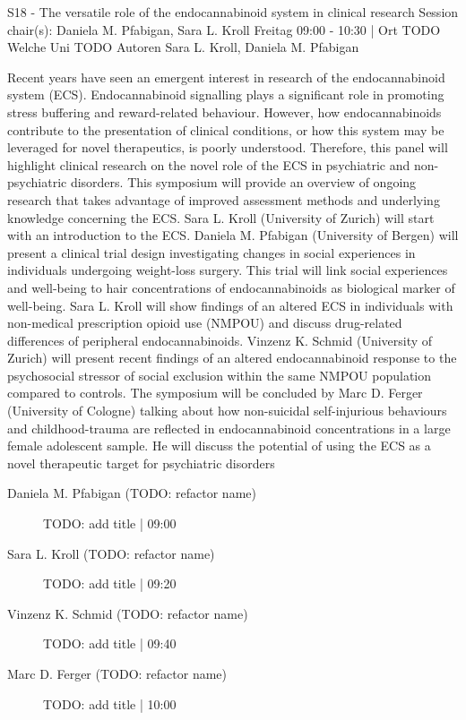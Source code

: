
            \begin{symposium}
            {S18 - The versatile role of the endocannabinoid system in clinical research}
            {Session chair(s): Daniela M. Pfabigan, Sara L. Kroll}
            {Freitag 09:00 - 10:30 | Ort TODO}
            {Welche Uni TODO}
            Autoren Sara L. Kroll, Daniela M. Pfabigan

Recent years have seen an emergent interest in research of the endocannabinoid system (ECS). Endocannabinoid signalling plays a significant role in promoting stress buffering and reward-related behaviour. However, how endocannabinoids contribute to the presentation of clinical conditions, or how this system may be leveraged for novel therapeutics, is poorly understood. Therefore, this panel will highlight clinical research on the novel role of the ECS in psychiatric and non-psychiatric disorders.
This symposium will provide an overview of ongoing research that takes advantage of improved assessment methods and underlying knowledge concerning the ECS. Sara L. Kroll (University of Zurich) will start with an introduction to the ECS. Daniela M. Pfabigan (University of Bergen) will present a clinical trial design investigating changes in social experiences in individuals undergoing weight-loss surgery. This trial will link social experiences and well-being to hair concentrations of endocannabinoids as biological marker of well-being. Sara L. Kroll will show findings of an altered ECS in individuals with non-medical prescription opioid use (NMPOU) and discuss drug-related differences of peripheral endocannabinoids. Vinzenz K. Schmid (University of Zurich) will present recent findings of an altered endocannabinoid response to the psychosocial stressor of social exclusion within the same NMPOU population compared to controls. The symposium will be concluded by Marc D. Ferger (University of Cologne) talking about how non-suicidal self-injurious behaviours and childhood-trauma are reflected in endocannabinoid concentrations in a large female adolescent sample. He will discuss the potential of using the ECS as a novel therapeutic target for psychiatric disorders
            \begin{description}    
            
                \item [Daniela M. Pfabigan (TODO: refactor name)] TODO: add title \textcolor{mygray}{ | 09:00}    
                
                \item [Sara L. Kroll  (TODO: refactor name)] TODO: add title \textcolor{mygray}{ | 09:20}    
                
                \item [Vinzenz K. Schmid (TODO: refactor name)] TODO: add title \textcolor{mygray}{ | 09:40}    
                
                \item [Marc D. Ferger (TODO: refactor name)] TODO: add title \textcolor{mygray}{ | 10:00}    
                
            \end{description} 
            \end{symposium}
            